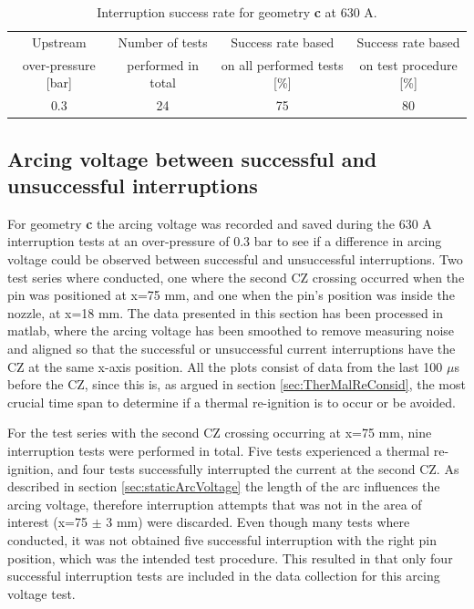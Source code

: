 \documentclass[10pt,b5paper,twoside]{article}
\begin{document}
\begin{table}[H]
\center
\caption{Interruption success rate for geometry \textbf{c} at 630 A.}
\begin{tabular}{|c|c|c|c|}
\hline 
Upstream & Number of tests & Success rate based & Success rate based \\ over-pressure [bar] &  performed in total &  on all performed tests [\%] &  on test procedure [\%] \\ 
\hline 
0.3 & 24 & 75 & 80 \\ 
\hline  
\end{tabular} 
\label{tab:successrate2}
\end{table}


\newpage
\subsection{Arcing voltage between successful and unsuccessful interruptions} \label{sec:arcingVoltageSuccessFulandUnsuccessfulResults}
For geometry \textbf{c} the arcing voltage was recorded and saved during the 630 A interruption tests at an over-pressure of 0.3 bar to see if a difference in arcing voltage could be observed between successful and unsuccessful interruptions. Two test series where conducted, one where the second CZ crossing occurred when the pin was positioned at x=75 mm, and one when the pin's position was inside the nozzle, at x=18 mm. The data presented in this section has been processed in matlab, where the arcing voltage has been smoothed to remove measuring noise and aligned so that the successful or unsuccessful current interruptions have the CZ at the same x-axis position. All the plots consist of data from the last 100 $\mu$s before the CZ, since this is, as argued in section \ref{sec:TherMalReConsid}, the most crucial time span to determine if a thermal re-ignition is to occur or be avoided.

For the test series with the second CZ crossing occurring at x=75 mm, nine interruption tests were performed in total. Five tests experienced a thermal re-ignition, and four tests successfully interrupted the current at the second CZ. As described in section \ref{sec:staticArcVoltage} the length of the arc influences the arcing voltage, therefore interruption attempts that was not in the area of interest (x=75 $\pm$ 3 mm) were discarded. Even though many tests where conducted, it was not obtained five successful interruption with the right pin position, which was the intended test procedure. This resulted in that only four successful interruption tests are included in the data collection for this arcing voltage test.
\end{document}
